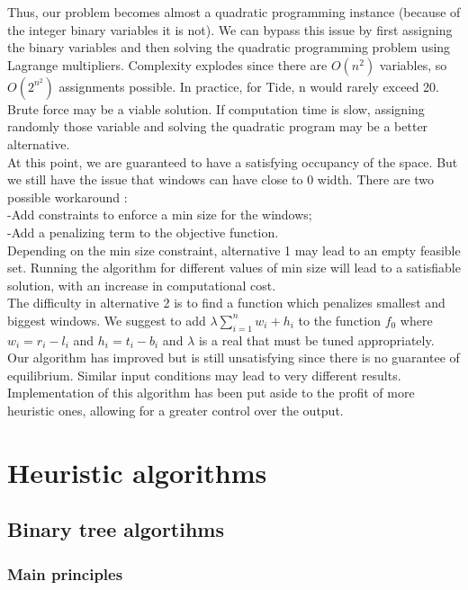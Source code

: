 \documentclass{acmtog}
\begin{document}
Thus, our problem becomes almost a quadratic programming instance (because of the integer binary variables it is not).
We can bypass this issue by first assigning the binary variables and then solving the quadratic programming problem using Lagrange multipliers.  %
Complexity explodes since there are $O(n^2)$ variables, so $O(2^{n^2})$ assignments possible. In practice, for Tide, n would rarely exceed 20. Brute force may be a viable solution. If computation time is slow, assigning randomly those variable and solving the quadratic program may be a better alternative. \\
At this point, we are guaranteed to have a satisfying occupancy of the space. But we still have the issue that windows can have close to 0 width. There are two possible workaround : \\
-Add constraints to enforce a min size for the windows; \\%
-Add a penalizing term to the objective function. \\
Depending on the min size constraint, alternative 1 may lead to an empty feasible set. Running the algorithm for different values of min size will lead to a satisfiable solution, with an increase in computational cost. \\
The difficulty in alternative 2 is to find a function which penalizes smallest and biggest windows. We suggest to add $\lambda \sum_{i = 1}^{n}{w_i + h_i}$ to the function $f_0$ where $w_i = r_i - l_i$ and $h_i = t_i - b_i$ and $\lambda$ is a real that must be tuned appropriately. \\
Our algorithm has improved but is still unsatisfying since there is no guarantee of equilibrium. %
Similar input conditions may lead to very different results. Implementation of this algorithm has been put aside to the profit of more heuristic ones, allowing for a greater control over the output.


\section{Heuristic algorithms}

\subsection{Binary tree algortihms}

\subsubsection{Main principles}
\end{document}
